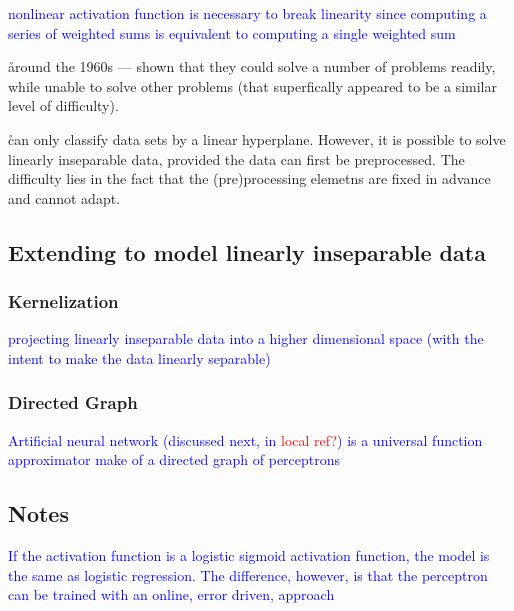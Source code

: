 \textcolor{blue}{}

\textcolor{blue}{nonlinear activation function is necessary to break linearity since computing a series of weighted sums is equivalent to computing a single weighted sum}

\r{around the 1960s --- shown that they could solve a number of problems readily, while unable to solve other problems (that superfically appeared to be a similar level of difficulty). }

\r{can only classify data sets by a linear hyperplane. However, it is possible to solve linearly inseparable data, provided the data can first be preprocessed. The difficulty lies in the fact that the (pre)processing elemetns are fixed in advance and cannot adapt.}

\subsection{Extending to model linearly inseparable data}

\subsubsection{Kernelization}

\textcolor{blue}{projecting linearly inseparable data into a higher dimensional space (with the intent to make the data linearly separable)}

\subsubsection{Directed Graph}

\textcolor{blue}{Artificial neural network (discussed next, in \textcolor{red}{local ref?}) is a universal function approximator make of a directed graph of perceptrons}

\subsection{Notes}

\textcolor{blue}{If the activation function is a logistic sigmoid activation function, the model is the same as logistic regression.  The difference, however, is that the perceptron can be trained with an online, error driven, approach}